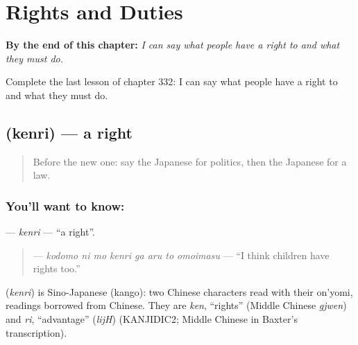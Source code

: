 
\chapter{Rights and Duties}
\label{ch:ja-rights-and-duties}

\begin{chapteropening}
\textbf{By the end of this chapter:} \emph{I can say what people have a right to and what they must do.}

Complete the last lesson of chapter 332: I can say what people have a right to and what they must do.
\end{chapteropening}

\section[\texorpdfstring{\ja{けんり} (kenri)}{けんり (kenri)}]{ (kenri) — a right}

\label{lesson:JA-C332-kenri}



\begin{quote}
Before the new one: say the Japanese for politics, then the Japanese for a law.
\end{quote}

\subsection*{You'll want to know: }
\textbf{} — \emph{kenri} — \textquotedblleft{}a right\textquotedblright{}.

\begin{quote}
\textbf{   } — \emph{kodomo ni mo kenri ga aru to omoimasu} — \textquotedblleft{}I think children have rights too.\textquotedblright{}
\end{quote}

\begin{cousinweb}
\textbf{} (\emph{kenri}) is Sino-Japanese (kango): two Chinese characters read with their on'yomi, readings borrowed from Chinese. They are \emph{ken}, \textquotedblleft{}rights\textquotedblright{} (Middle Chinese \emph{gjwen}) and \emph{ri}, \textquotedblleft{}advantage\textquotedblright{} (\emph{lijH}) (KANJIDIC2; Middle Chinese in Baxter's transcription).
\end{cousinweb}

